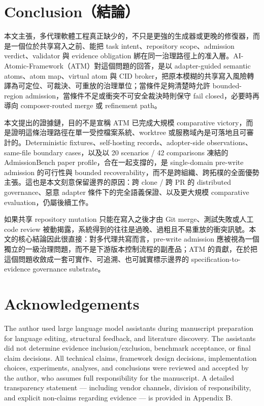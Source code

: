 \documentclass[a4paper,fontset=none]{ctexart}
\begin{document}
\medskip

\section{Conclusion（結論）}

本文主張，多代理軟體工程真正缺少的，不只是更強的生成器或更晚的修復器，而是一個位於共享寫入之前、能把 task intent、repository scope、admission verdict、validator 與 evidence obligation 綁在同一治理路徑上的准入層。AI-Atomic-Framework（ATM）對這個問題的回答，是以 adapter-guided semantic atoms、atom map、virtual atom 與 CID broker，把原本模糊的共享寫入風險轉譯為可定位、可裁決、可重放的治理單位；當條件足夠清楚時允許 bounded-region admission，當條件不足或衝突不可安全裁決時則保守 fail closed，必要時再導向 composer-routed merge 或 refinement path。

本文提出的證據鏈，目的不是宣稱 ATM 已完成大規模 comparative victory，而是證明這條治理路徑在單一受控檔案系統、worktree 或服務域內是可落地且可審計的。Deterministic fixtures、self-hosting records、adopter-side observations、same-file boundary cases，以及以 20 scenarios / 42 comparisons 凍結的 AdmissionBench paper profile，合在一起支撐的，是 single-domain pre-write admission 的可行性與 bounded recoverability，而不是跨組織、跨拓樸的全面優勢主張。這也是本文刻意保留邊界的原因：跨 clone / 跨 PR 的 distributed governance、惡意 adapter 條件下的完全語義保證、以及更大規模 comparative evaluation，仍屬後續工作。

如果共享 repository mutation 只能在寫入之後才由 Git merge、測試失敗或人工 code review 被動揭露，系統得到的往往是過晚、過粗且不易重放的衝突訊號。本文的核心結論因此很直接：對多代理共寫而言，pre-write admission 應被視為一個獨立的一級治理問題，而不是下游版本控制流程的副產品；ATM 的貢獻，在於把這個問題收斂成一套可實作、可追溯、也可誠實標示邊界的 specification-to-evidence governance substrate。

\medskip

\section*{Acknowledgements}

The author used large language model assistants during manuscript preparation for language editing, structural feedback, and literature discovery. The assistants did not determine evidence inclusion/exclusion, benchmark acceptance, or final claim decisions. All technical claims, framework design decisions, implementation choices, experiments, analyses, and conclusions were reviewed and accepted by the author, who assumes full responsibility for the manuscript. A detailed transparency statement --- including vendor channels, division of responsibility, and explicit non-claims regarding evidence --- is provided in Appendix B.
\end{document}
